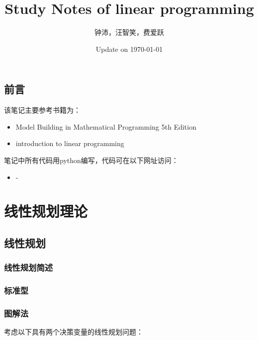 \documentclass[12pt,oneside,UTF8]{ctexbook} %
\begin{document}
\title{\bf \huge Study Notes of linear programming}
\author{钟沛，汪智笑，费爱跃}
\date{Update on \today}

\maketitle



\tableofcontents
\begin{spacing}{1.5}

\chapter*{前言}


该笔记主要参考书籍为：
\begin{itemize}
    \item Model Building in Mathematical Programming 5th Edition
    \item introduction to linear programming
\end{itemize}

\par
笔记中所有代码用python编写，代码可在以下网址访问：
\begin{itemize}
    \item -
\end{itemize}




\part{线性规划理论}
\chapter{线性规划}\label{chp:线性规划}

\section{线性规划简述}

\section{标准型}

\section{图解法}
考虑以下具有两个决策变量的线性规划问题：



\end{spacing}
\end{document}
